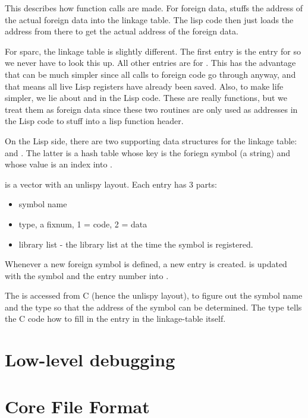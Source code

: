 This describes how function calls are made. For foreign data,
 stuffs the address of the actual foreign
data into the linkage table. The lisp code then just loads the address
from there to get the actual address of the foreign data.

For sparc, the linkage table is slightly different. The first entry is
the entry for  so we never have to look this up. All
other entries are for . This has the
advantage that  can be much simpler since
all calls to foreign code go through  anyway, and
that means all live Lisp registers have already been saved. Also, to
make life simpler, we lie about  and
 in the Lisp code. These are really functions,
but we treat them as foreign data since these two routines are only
used as addresses in the Lisp code to stuff into a lisp function
header.

On the Lisp side, there are two supporting data structures for the
linkage table:  and
. The latter is a hash table whose key
is the foriegn symbol (a string) and whose value is an index into
.

 is a vector with an unlispy layout. Each
entry has 3 parts:

\begin{itemize}
\item symbol name
\item type, a fixnum, 1 = code, 2 = data
\item library list - the library list at the time the symbol is registered.
\end{itemize}

Whenever a new foreign symbol is defined, a new
 entry is created.
 is updated with the symbol and the
entry number into .

The  is accessed from C (hence the unlispy
layout), to figure out the symbol name and the type so that the
address of the symbol can be determined.  The type tells the C code
how to fill in the entry in the linkage-table itself.



\chapter{Low-level debugging}

\chapter{Core File Format}
